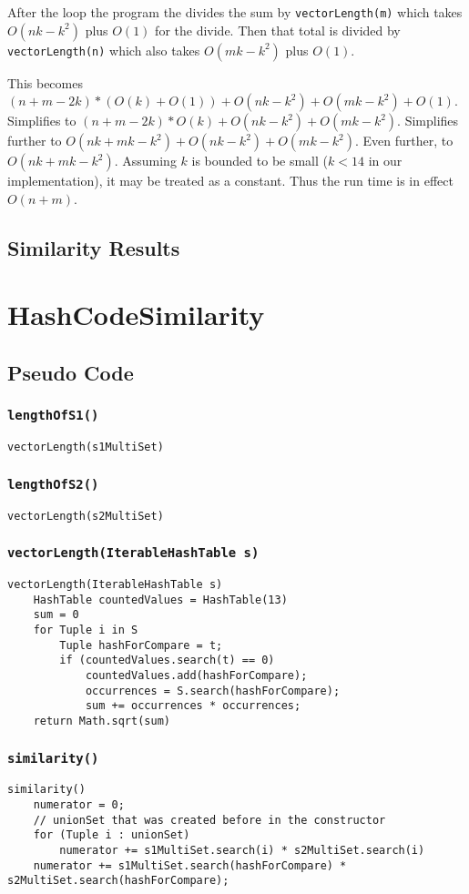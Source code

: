 \documentclass[10pt,letterpaper]{article}
\begin{document}
After the loop the program the divides the sum by \texttt{vectorLength(m)} which takes $O(nk-k^2)$ plus $O(1)$ for the divide. Then that total is divided by \texttt{vectorLength(n)} which also takes $O(mk-k^2)$ plus $O(1)$.

This becomes $(n+m-2k)*(O(k)+O(1))+O(nk-k^2)+O(mk-k^2)+O(1)$. Simplifies to $(n+m-2k)*O(k)+O(nk-k^2)+O(mk-k^2)$. Simplifies further to $O(nk+mk-k^2)+O(nk-k^2)+O(mk-k^2)$. Even further, to $O(nk+mk-k^2)$. Assuming $k$ is bounded to be small ($k<14$ in our implementation), it may be treated as a constant. Thus the run time is in effect $O(n+m)$.
\subsection{Similarity Results}
\section{HashCodeSimilarity}
\subsection{Pseudo Code}
\subsubsection{\texttt{lengthOfS1()}}
\begin{verbatim}
vectorLength(s1MultiSet)
\end{verbatim}
\subsubsection{\texttt{lengthOfS2()}}
\begin{verbatim}
vectorLength(s2MultiSet)
\end{verbatim}
\subsubsection{\texttt{vectorLength(IterableHashTable s)}}
\begin{verbatim}
vectorLength(IterableHashTable s)
    HashTable countedValues = HashTable(13)
    sum = 0
    for Tuple i in S
        Tuple hashForCompare = t;
        if (countedValues.search(t) == 0)
            countedValues.add(hashForCompare);
            occurrences = S.search(hashForCompare);
            sum += occurrences * occurrences;
    return Math.sqrt(sum)
\end{verbatim}
\subsubsection{\texttt{similarity()}}
\begin{verbatim}
similarity()
    numerator = 0;
    // unionSet that was created before in the constructor
    for (Tuple i : unionSet)
        numerator += s1MultiSet.search(i) * s2MultiSet.search(i)
    numerator += s1MultiSet.search(hashForCompare) * s2MultiSet.search(hashForCompare);
\end{verbatim}
\end{document}
